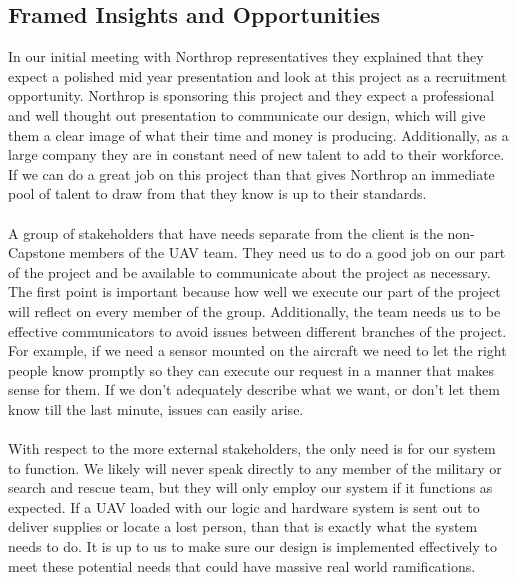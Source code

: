 \documentclass[12pt]{article}
\begin{document}
\subsection{Framed Insights and Opportunities}
In our initial meeting with Northrop representatives they explained that they expect a polished mid year presentation and look at this project as a recruitment opportunity. Northrop is sponsoring this project and they expect a professional and well thought out presentation to communicate our design, which will give them a clear image of what their time and money is producing. Additionally, as a large company they are in constant need of new talent to add to their workforce. If we can do a great job on this project than that gives Northrop an immediate pool of talent to draw from that they know is up to their standards.\\\\
A group of stakeholders that have needs separate from the client is the non-Capstone members of the UAV team. They need us to do a good job on our part of the project and be available to communicate about the project as necessary. The first point is important because how well we execute our part of the project will reflect on every member of the group. Additionally, the team needs us to be effective communicators to avoid issues between different branches of the project. For example, if we need a sensor mounted on the aircraft we need to let the right people know promptly so they can execute our request in a manner that makes sense for them. If we don't adequately describe what we want, or don't let them know till the last minute, issues can easily arise.\\\\
With respect to the more external stakeholders, the only need is for our system to function. We likely will never speak directly to any member of the military or search and rescue team, but they will only employ our system if it functions as expected. If a UAV loaded with our logic and hardware system is sent out to deliver supplies or locate a lost person, than that is exactly what the system needs to do. It is up to us to make sure our design is implemented effectively to meet these potential needs that could have massive real world ramifications.\\\\
\end{document}
